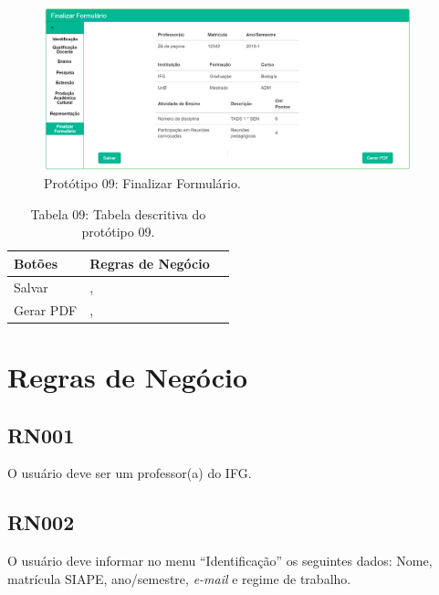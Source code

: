 \begin{figure}[H]
    \centering
    \includegraphics[width=0.95\textwidth]{img/9pagina_finalizar_formulario.png}
    \caption[Protótipo 09: Finalizar Formulário]{Protótipo 09: Finalizar Formulário.}
    \label{fig:prot09}
\end{figure}


\begin{table}[H]
\centering
\caption[Tabela 09: Tabela descritiva do protótipo 09.]{Tabela 09: Tabela descritiva do protótipo 09.}
\label{tab:prot09}
\begin{tabular}{@{}lll@{}}
\toprule
Botões      &  Regras de Negócio                                \\ \midrule
Salvar      &     \nameref{rn012}, \nameref{rn015}              \\
Gerar PDF   &     \nameref{rn012}, \nameref{rn014}              \\ \bottomrule
\end{tabular}
\end{table}



\newpage
\section{Regras de Negócio}\label{RegrasDeNegocio}

\subsection{RN001}\label{rn001}

O usuário deve ser um professor(a) do IFG.

\subsection{RN002}\label{rn002}

O usuário deve informar no menu ``Identificação'' os seguintes dados: Nome, matrícula SIAPE, ano/semestre, \textit{e-mail} e regime de trabalho.

